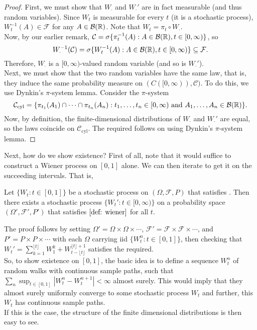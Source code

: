 \begin{proof}
	First, we must show that $W_{\cdot}$ and $W_{\cdot}'$ are in fact measurable (and thus random variables). Since $W_t$ is measurable for every $t$ (it is a stochastic process), $W_t^{-1}(A)\in\mathcal{F}$ for any $A\in\mathcal{B}(\mathbb{R})$. Note that $W_t = \pi_t\circ W_\cdot$.\\
	Now, by our earlier remark, $\mathcal{C} = \sigma\{\pi_t^{-1}(A) : A\in\mathcal{B}(\mathbb{R}), t\in[0,\infty)\}$, so
	\[ W_{\cdot}^{-1}(\mathcal{C}) = \sigma\{W_t^{-1}(A) : A\in\mathcal{B}(\mathbb{R}), t\in[0,\infty)\}\subseteq \mathcal{F}. \]
	Therefore, $W_{\cdot}$ is a $[0,\infty)$-valued random variable (and so is $W_{\cdot}'$).\\

	Next, we must show that the two random variables have the same law, that is, they induce the same probability measure on $(C([0,\infty)),\mathcal{C})$. To do this, we use Dynkin's $\pi$-system lemma. Consider the $\pi$-system
	\[ \mathcal{C}_{\text{cyl}} = \{ \pi_{t_1}(A_1)\cap\cdots\cap\pi_{t_n}(A_n) : t_1,\ldots,t_n\in[0,\infty) \text{ and } A_1,\ldots,A_n\in\mathcal{B}(\mathbb{R}) \}. \]
	Now, by definition, the finite-dimensional distributions of $W_{\cdot}$ and $W_{\cdot}'$ are equal, so the laws coincide on $\mathcal{C}_\text{cyl}$. The required follows on using Dynkin's $\pi$-system lemma.
\end{proof}

Next, how do we show existence? First of all, note that it would suffice to construct a Wiener process on $[0,1]$ alone. We can then iterate to get it on the succeeding intervals. That is,
\begin{lemma}
	Let $\{W_t : t\in[0,1]\}$ be a stochastic process on $(\Omega,\mathcal{F},P)$ that satisfies . Then there exists a stochastic process $\{W_t' : t\in[0,\infty)\}$ on a probability space $(\Omega',\mathcal{F}',P')$ that satisfies $\Cref{def: wiener}$ for all $t$.
\end{lemma}

The proof follows by setting $\Omega'=\Omega\times\Omega\times\cdots$, $\mathcal{F}'=\mathcal{F}\times\mathcal{F}\times\cdots$, and $P'=P\times P\times\cdots$ with each $\Omega$ carrying iid $\{W_t^n : t\in[0,1] \}$, then checking that $W_t' = \sum_{k=1}^{\lfloor t\rfloor} W_1^k + W_{t-\lfloor t\rfloor}^{\lfloor t\rfloor+1}$ satisfies the required.\\

So, to show existence on $[0,1]$, the basic idea is to define a sequence $W_t^n$ of random walks with continuous sample paths, such that $\sum_n \sup_{t\in[0,1]} |W_t^n - W_t^{n+1}| < \infty$ almost surely. This would imply that they almost surely uniformly converge to some stochastic process $W_t$ and further, this $W_t$ has continuous sample paths.\\
If this is the case, the structure of the finite dimensional distributions is then easy to see.\\

